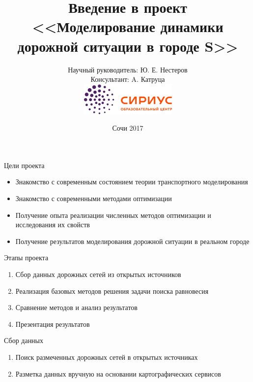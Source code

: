 \documentclass[12pt]{beamer}
\begin{document}
\title[]{Введение в проект \\ <<Моделирование динамики дорожной ситуации в городе S>>}

\author[А. Катруца]{Научный руководитель: Ю. Е. Нестеров \\ Консультант: A. Катруца \\[0.5cm] 
\includegraphics[scale=0.5]{logo_sirius}}

\date{Сочи 2017}


\begin{frame}
\maketitle
\end{frame}

\begin{frame}{Цели проекта}
\begin{itemize}
\item Знакомство с современным состоянием теории транспортного моделирования 
\item Знакомство с современными методами оптимизации
\item Получение опыта реализации численных методов оптимизации и исследования их свойств
\item Получение результатов моделирования дорожной ситуации в реальном городе
\end{itemize}
\end{frame}

\begin{frame}{Этапы проекта}
\begin{enumerate}
\item Сбор данных дорожных сетей из открытых источников
\item Реализация базовых методов решения задачи поиска равновесия
\item Сравнение методов и анализ результатов
\item Презентация результатов
\end{enumerate}
\end{frame}

\begin{frame}{Сбор данных}
\begin{enumerate}
\item Поиск размеченных дорожных сетей в открытых источниках
\item Разметка данных вручную на основании картографических сервисов
\end{enumerate}
\end{frame}
\end{document}

